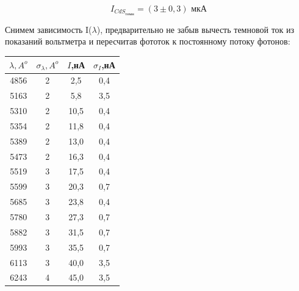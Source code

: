 \documentclass[a4paper,12pt]{report}
\begin{document}
\begin{equation*}
    I_{CdS_{\text{темн}}} = (3\pm 0,3) \text{ мкА}
\end{equation*}

Снимем зависимость I($\lambda$), предварительно не забыв вычесть темновой ток из показаний вольтметра и пересчитав фототок к постоянному потоку фотонов:

\begin{table}[H]
\begin{center}
\begin{tabular}{|c|c|c|c|}
\hline
$\lambda, A^{o}$ & $\sigma_{\lambda}, A^{o}$ & $I$,нА & $\sigma_{I}$,нА \\ \hline
4856      & 2               & 2,5                         & 0,4                              \\ \hline
5163      & 2               & 5,8                         & 3,5                              \\ \hline
5310      & 2               & 10,5                        & 0,4                              \\ \hline
5354      & 2               & 11,8                        & 0,4                              \\ \hline
5389      & 2               & 13,0                        & 0,4                              \\ \hline
5473      & 2               & 16,3                        & 0,4                              \\ \hline
5519      & 3               & 17,5                        & 0,4                              \\ \hline
5599      & 3               & 20,3                        & 0,7                              \\ \hline
5685      & 3               & 23,8                        & 0,4                              \\ \hline
5780      & 3               & 27,3                        & 0,7                              \\ \hline
5882      & 3               & 31,5                        & 0,7                              \\ \hline
5993      & 3               & 35,5                        & 0,7                              \\ \hline
6113      & 3               & 40,0                        & 3,5                              \\ \hline
6243      & 4               & 45,0                        & 3,5                              \\ \hline

\end{tabular}
\end{center}
\end{table}
\end{document}
